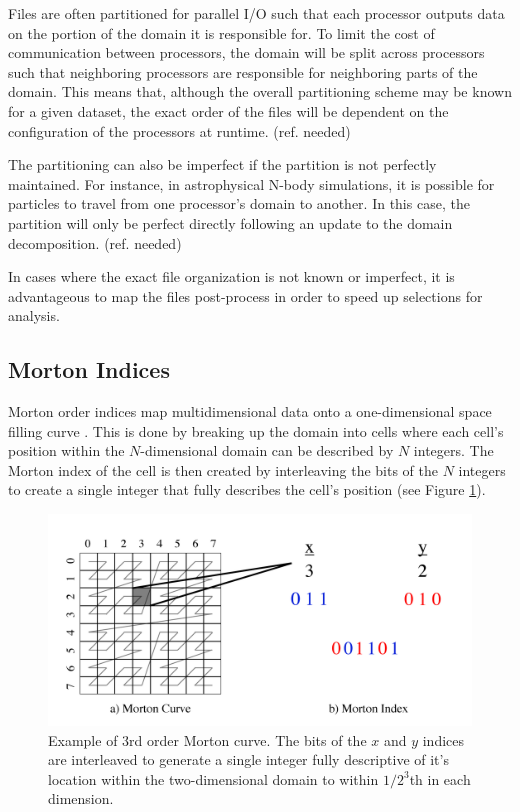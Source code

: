 \documentclass[apjl]{emulateapj}
\newcommand{\addref}{{\color{red}(ref. needed)}}
\begin{document}
Files are often partitioned for parallel I/O such that each processor outputs data on the portion of the domain it is responsible for. To limit the cost of communication between processors, the domain will be split across processors such that neighboring processors are responsible for neighboring parts of the domain. This means that, although the overall partitioning scheme may be known for a given dataset, the exact order of the files will be dependent on the configuration of the processors at runtime. \addref

The partitioning can also be imperfect if the partition is not perfectly maintained. For instance, in astrophysical N-body simulations, it is possible for particles to travel from one processor's domain to another. In this case, the partition will only be perfect directly following an update to the domain decomposition. \addref

In cases where the exact file organization is not known or imperfect, it is advantageous to map the files post-process in order to speed up selections for analysis. 

\subsection{Morton Indices}
Morton order indices map multidimensional data onto a one-dimensional space filling curve \citep{Morton1996}. This is done by breaking up the domain into cells where each cell's position within the $N$-dimensional domain can be described by $N$ integers. The Morton index of the cell is then created by interleaving the bits of the $N$ integers to create a single integer that fully describes the cell's position (see Figure \ref{fig:zorder}). 
%
\begin{figure}[htbp]
\begin{center}
\includegraphics[width=\columnwidth,keepaspectratio]{../images/zorder.png}
\caption{Example of 3rd order Morton curve. The bits of the $x$ and $y$ indices are interleaved to generate a single integer fully descriptive of it's location within the two-dimensional domain to within $1/2^{3}$th in each dimension.}
\label{fig:zorder}
\end{center}
\end{figure}
%
\end{document}
